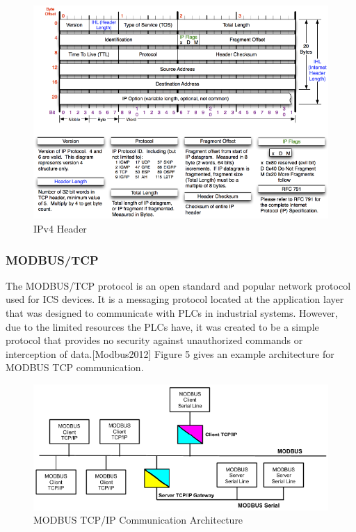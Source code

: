 \documentclass[12pt,]{article}
\begin{document}
\begin{figure}

{\centering \includegraphics{thesis_files/figure-latex/unnamed-chunk-7-1} 

}

\caption{IPv4 Header}\label{fig:unnamed-chunk-7}
\end{figure}

\subsubsection{MODBUS/TCP}\label{modbustcp}

The MODBUS/TCP protocol is an open standard and popular network protocol
used for ICS devices. It is a messaging protocol located at the
application layer that was designed to communicate with PLCs in
industrial systems. However, due to the limited resources the PLCs have,
it was created to be a simple protocol that provides no security against
unauthorized commands or interception of data.{[}Modbus2012{]} Figure 5
gives an example architecture for MODBUS TCP communication.

\begin{figure}

{\centering \includegraphics{thesis_files/figure-latex/unnamed-chunk-8-1} 

}

\caption{MODBUS TCP/IP Communication Architecture}\label{fig:unnamed-chunk-8}
\end{figure}
\end{document}
